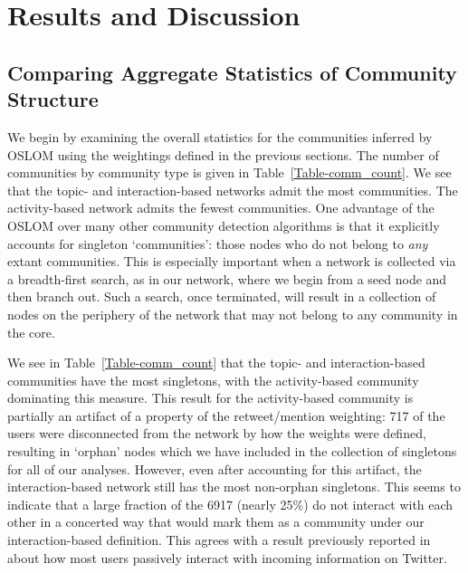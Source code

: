 \section{Results and Discussion}

\subsection{Comparing Aggregate Statistics of Community Structure}

We begin by examining the overall statistics for the communities inferred by OSLOM using the weightings defined in the previous sections. The number of communities by community type is given in Table~\ref{Table-comm_count}. We see that the topic- and interaction-based networks admit the most communities. The activity-based network admits the fewest communities.  One advantage of the OSLOM over many other community detection algorithms is that it explicitly accounts for singleton `communities': those nodes who do not belong to \emph{any} extant communities. This is especially important when a network is collected via a breadth-first search, as in our network, where we begin from a seed node and then branch out. Such a search, once terminated, will result in a collection of nodes on the periphery of the network that may not belong to any community in the core.


We see in Table~\ref{Table-comm_count} that the topic- and interaction-based communities have the most singletons, with the activity-based community dominating this measure. This result for the activity-based community is partially an artifact of a property of the retweet/mention weighting: 717 of the users were disconnected from the network by how the weights were defined, resulting in `orphan' nodes which we have included in the collection of singletons for all of our analyses. However, even after accounting for this artifact, the interaction-based network still has the most non-orphan singletons. This seems to indicate that a large fraction of the 6917 (nearly 25\%) do not interact with each other in a concerted way that would mark them as a community under our interaction-based definition. This agrees with a result previously reported in~\cite{romero2011influence} about how most users passively interact with incoming information on Twitter.

